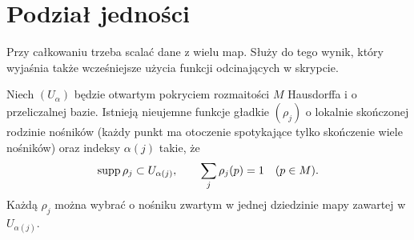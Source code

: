 \section{Podział jedności}
\label{sec:formy-podzial-jednosci}

Przy całkowaniu trzeba scalać dane z wielu map.
Służy do tego wynik, który wyjaśnia także wcześniejsze
użycia funkcji odcinających w skrypcie.

\begin{twierdzenie}
\label{thm:podzial-jednosci-formy}
Niech $(U_\alpha)$ będzie otwartym pokryciem rozmaitości
$M$ Hausdorffa i o przeliczalnej bazie. Istnieją
nieujemne funkcje gładkie $(\rho_j)$ o lokalnie skończonej
rodzinie nośników (każdy punkt ma otoczenie spotykające
tylko skończenie wiele nośników) oraz indeksy $\alpha(j)$ takie, że
\[
 \operatorname{supp}\rho_j\subset U_{\alpha(j)},
 \qquad \sum_j\rho_j(p)=1\quad(p\in M).
\]
Każdą $\rho_j$ można wybrać o nośniku zwartym
w jednej dziedzinie mapy zawartej w $U_{\alpha(j)}$.
\end{twierdzenie}
